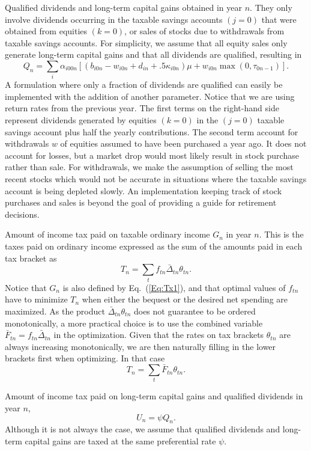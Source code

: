 \documentclass{report}[fleqn,12pt]
\begin{document}
\begin{description}[leftmargin=4em,style=multiline]
\item [$Q_n$]
	Qualified dividends and long-term capital gains obtained in year $n$.
	They only involve dividends occurring in the taxable savings accounts $(j=0)$ that
	were obtained from equities $(k=0)$, or sales of stocks due to withdrawals
	from taxable savings accounts.
	For simplicity, we assume that all equity sales only generate long-term capital gains and
	that all dividends are qualified, resulting in
	\begin{equation}
		\label{Eq:Qx2}
		Q_n = \sum_{i} \alpha_{i00n}\left[(b_{i0n} - w_{i0n} + d_{in} + .5\kappa_{i0n})\mu +
		w_{i0n}{\max(0, \tau_{0n-1})}\right].
	\end{equation}
	A formulation where only a fraction of dividends are qualified can easily be
	implemented with the addition of another parameter.
	Notice that we are using return rates from the previous year.
	The first terms on the right-hand side represent dividends generated by
        equities $(k=0)$ in the $(j=0)$ taxable savings account plus
	half the yearly contributions. The second term account for withdrawals $w$
        of equities assumed to have been purchased a year ago. 
	It does not account for losses, but a market drop
	would most likely result in stock purchase rather than sale.
	For withdrawals, we make the assumption of
	selling the most recent stocks which would not be accurate in situations where
	the taxable savings account is being depleted slowly. An implementation keeping track
	of stock purchases and sales is beyond the goal of providing a guide for retirement decisions.

\item [$T_n$]
	Amount of income tax paid on taxable ordinary income $G_n$ in year $n$.
	This is the taxes paid on ordinary income expressed as the sum of the amounts
	paid in each tax bracket as
	\begin{equation}
		\label{Eq:IncTax0}
		T_n = \sum_t f_{tn}\bar{\Delta}_{tn}\theta_{tn}.
	\end{equation}
	Notice that $G_n$ is also defined by Eq.~(\ref{Eq:Tx1}), and that optimal
	values of $f_{tn}$ have to
	minimize $T_n$ when either the bequest or the desired net spending are maximized.
	As the product $\bar{\Delta}_{tn}\theta_{tn}$ does not guarantee to
	be ordered monotonically, a more practical choice is to use the combined variable
	$\bar{F}_{tn} = f_{tn}\bar{\Delta}_{tn}$ in the optimization. Given that the rates on
	tax brackets $\theta_{tn}$ are always increasing monotonically, we are then naturally
	filling in the lower brackets first when optimizing. In that case
	\begin{equation}
		\label{Eq:IncTax1}
		T_n = \sum_t \bar{F}_{tn} \theta_{tn}.
	\end{equation}
\item [$U_n$]
	Amount of income tax paid on long-term capital gains and qualified dividends in year $n$,
	\begin{equation}
		U_n = \psi Q_n.
	\end{equation}
	Although it is not always the case, we assume that qualified dividends and long-term
	capital gains are taxed at the same preferential rate $\psi$.


\end{description}
\end{document}
